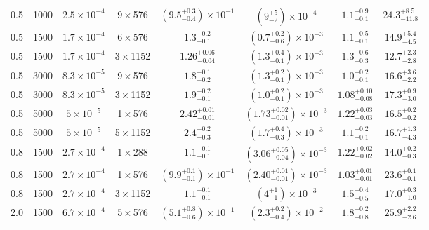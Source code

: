 \documentclass[12pt,twoside]{extreport}
\begin{document}
\begin{table}
{{\begin{tabular}{
    c c c c
    c c c c
}
0.5 & 1000 & $2.5\times 10^{-4}$ & 9\,$\times$\,576 & $\left(9.5_{-0.4}^{+0.3}\right)\times 10^{-1}$ & $\left(9_{-2}^{+5}\right)\times 10^{-4}$ & $1.1_{-0.1}^{+0.9}$ & $24.3_{-11.8}^{+8.5}$ \\

0.5 & 1500 & $1.7\times 10^{-4}$ & 6\,$\times$\,576 & $1.3_{-0.1}^{+0.2}$ & $\left(0.7_{-0.6}^{+0.2}\right)\times 10^{-3}$ & $1.1_{-0.1}^{+0.5}$ & $14.9_{-4.5}^{+5.4}$ \\

0.5 & 1500 & $1.7\times 10^{-4}$ & 3\,$\times$\,1152 & $1.26_{-0.04}^{+0.06}$ & $\left(1.3_{-0.1}^{+0.4}\right)\times 10^{-3}$ & $1.3_{-0.3}^{+0.6}$ & $12.7_{-2.8}^{+2.3}$ \\

0.5 & 3000 & $8.3\times 10^{-5}$ & 9\,$\times$\,576 & $1.8_{-0.2}^{+0.1}$ & $\left(1.3_{-0.1}^{+0.2}\right)\times 10^{-3}$ & $1.0_{-0.1}^{+0.2}$ & $16.6_{-2.2}^{+3.6}$ \\

0.5 & 3000 & $8.3\times 10^{-5}$ & 3\,$\times$\,1152 & $1.9_{-0.1}^{+0.2}$ & $\left(1.0_{-0.1}^{+0.2}\right)\times 10^{-3}$ & $1.08_{-0.08}^{+0.10}$ & $17.3_{-3.0}^{+0.9}$ \\

0.5 & 5000 & $5\times 10^{-5}$ & 1\,$\times$\,576 & $2.42_{-0.01}^{+0.01}$ & $\left(1.73_{-0.01}^{+0.02}\right)\times 10^{-3}$ & $1.22_{-0.03}^{+0.03}$ & $16.5_{-0.2}^{+0.2}$ \\

0.5 & 5000 & $5\times 10^{-5}$ & 5\,$\times$\,1152 & $2.4_{-0.3}^{+0.2}$ & $\left(1.7_{-0.3}^{+0.4}\right)\times 10^{-3}$ & $1.1_{-0.1}^{+0.2}$ & $16.7_{-4.3}^{+1.3}$ \\

0.8 & 1500 & $2.7\times 10^{-4}$ & 1\,$\times$\,288 & $1.1_{-0.1}^{+0.1}$ & $\left(3.06_{-0.04}^{+0.05}\right)\times 10^{-3}$ & $1.22_{-0.02}^{+0.02}$ & $14.0_{-0.3}^{+0.2}$ \\

0.8 & 1500 & $2.7\times 10^{-4}$ & 1\,$\times$\,576 & $\left(9.9_{-0.1}^{+0.1}\right)\times 10^{-1}$ & $\left(2.40_{-0.01}^{+0.01}\right)\times 10^{-3}$ & $1.03_{-0.01}^{+0.01}$ & $23.6_{-0.1}^{+0.1}$ \\

0.8 & 1500 & $2.7\times 10^{-4}$ & 3\,$\times$\,1152 & $1.1_{-0.1}^{+0.1}$ & $\left(4_{-1}^{+1}\right)\times 10^{-3}$ & $1.5_{-0.5}^{+0.4}$ & $17.0_{-1.0}^{+0.3}$ \\

2.0 & 1500 & $6.7\times 10^{-4}$ & 5\,$\times$\,576 & $\left(5.1_{-0.6}^{+0.8}\right)\times 10^{-1}$ & $\left(2.3_{-0.4}^{+0.2}\right)\times 10^{-2}$ & $1.8_{-0.8}^{+0.2}$ & $25.9_{-2.6}^{+2.2}$ \\


\end{tabular}}}
\end{table}
\end{document}
